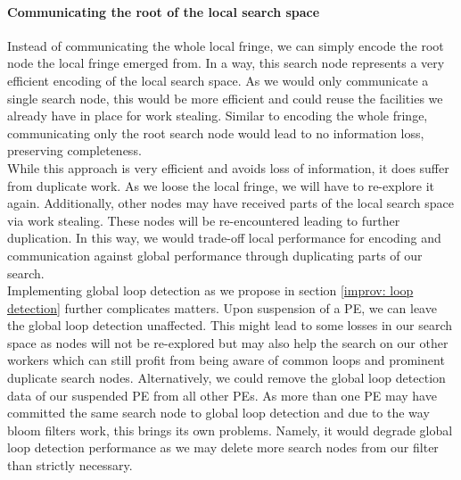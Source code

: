 \paragraph{Communicating the root of the local search space}
Instead of communicating the whole local fringe, we can simply encode the root node the local fringe emerged from. In a way, this search node represents a very efficient encoding of the local search space. As we would only communicate a single search node, this would be more efficient and could reuse the facilities we already have in place for work stealing. Similar to encoding the whole fringe, communicating only the root search node would lead to no information loss, preserving completeness. \\
While this approach is very efficient and avoids loss of information, it does suffer from duplicate work. As we loose the local fringe, we will have to re-explore it again. Additionally, other nodes may have received parts of the local search space via work stealing. These nodes will be re-encountered leading to further duplication. In this way, we would trade-off local performance for encoding and communication against global performance through duplicating parts of our search. \\
Implementing global loop detection as we propose in section \ref{improv: loop detection} further complicates matters. Upon suspension of a PE, we can leave the global loop detection unaffected. This might lead to some losses in our search space as nodes will not be re-explored but may also help the search on our other workers which can still profit from being aware of common loops and prominent duplicate search nodes. Alternatively, we could remove the global loop detection data of our suspended PE from all other PEs. As more than one PE may have committed the same search node to global loop detection and due to the way bloom filters work, this brings its own problems. Namely, it would degrade global loop detection performance as we may delete more search nodes from our filter than strictly necessary.
\begin{comment}
- easy and cheap
- duplication of work
- re-exploring things
- nodes that were sent off to other PEs
- how to deal with global loop detection
- delete everything, too conservative, less performance
- do not delete, cut off things wrongly
- restarts deal with this increased false positive rate
\end{comment}

